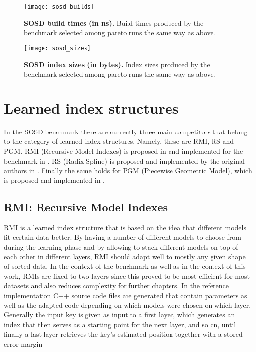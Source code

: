 \begin{figure}[!ht]
\centering
\texttt{[image: sosd\_builds]}
\caption[SOSD Build Times]{
  \textbf{SOSD build times (in ns).}
  Build times produced by the benchmark selected among pareto runs the same way as above.
}
\label{fig:sosd_builds}
\end{figure}

\begin{figure}[!ht]
\centering
\texttt{[image: sosd\_sizes]}
\caption[SOSD Index Sizes]{
  \textbf{SOSD index sizes (in bytes).}
  Index sizes produced by the benchmark selected among pareto runs the same way as above.
}
\label{fig:sosd_sizes}
\end{figure}

\section{Learned index structures}
In the SOSD benchmark there are currently three main competitors that belong to the category of learned index structures. Namely, these are RMI, RS and PGM. RMI (Recursive Model Indexes) is proposed in \cite{rmi} and implemented for the benchmark in \cite{cdfshop}. RS (Radix Spline) is proposed and implemented by the original authors in \cite{radixspline}. Finally the same holds for PGM (Piecewise Geometric Model), which is proposed and implemented in \cite{pgm}.

\subsection{RMI: Recursive Model Indexes}
\label{sect:background:rmi}
RMI \cite{rmi} is a learned index structure that is based on the idea that different models fit certain data better. By having a number of different models to choose from during the learning phase and by allowing to stack different models on top of each other in different layers, RMI should adapt well to mostly any given shape of sorted data. In the context of the benchmark as well as in the context of this work, RMIs are fixed to two layers since this proved to be most efficient for most datasets and also reduces complexity for further chapters. In the reference implementation \cite{cdfshop} C++ source code files are generated that contain parameters as well as the adapted code depending on which models were chosen on which layer. Generally the input key is given as input to a first layer, which generates an index that then serves as a starting point for the next layer, and so on, until finally a last layer retrieves the key's estimated position together with a stored error margin.\\

